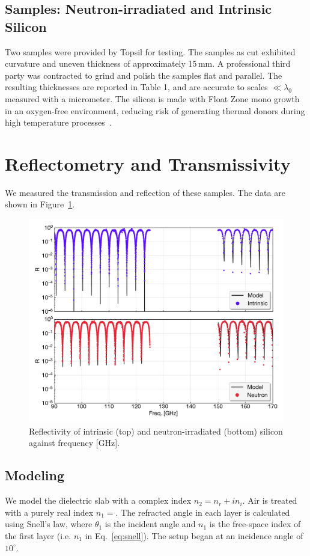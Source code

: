 \subsection{Samples: Neutron-irradiated and Intrinsic Silicon}
Two samples were provided by Topsil for testing. The samples as cut exhibited curvature and uneven thickness of approximately 15\,mm. A professional third party was contracted to grind and polish the samples flat and parallel. The
resulting thicknesses are reported in Table 1, and are accurate to scales $\ll \lambda_0$ measured with a micrometer. The silicon is made with Float Zone mono growth in an oxygen-free environment, reducing risk of generating thermal donors during
high temperature processes~\cite{topsil}.
\section{Reflectometry and Transmissivity}
We measured the transmission and reflection of these samples. The data are shown in Figure~\ref{fig:si_data}.
\begin{figure}
    \centering
    \includegraphics[width = .9\textwidth]{Figures/silicon_refl.pdf}
    \caption{Reflectivity of intrinsic (top) and neutron-irradiated (bottom) silicon against frequency [GHz].}
    \label{fig:si_data}
\end{figure}
\subsection{Modeling}
We model the dielectric slab with a complex index $n_2 = n_r + in_i$.  Air is treated with a purely real index $n_1 = $. The refracted angle in each layer is calculated using Snell's law, where $\theta_1$ is the incident angle and $n_1$ is the free-space
index of the first layer (i.e. $n_1$ in Eq.~\ref{eq:snell}). The setup began at an incidence angle of $10^{\circ}$.

